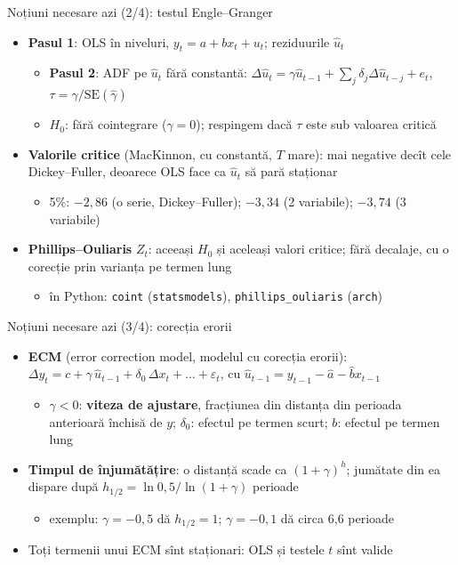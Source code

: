 \begin{frame}{Noțiuni necesare azi (2/4): testul Engle--Granger}
\itemsize{\small}
\begin{itemize}
    \item \textbf{Pasul 1}: OLS în niveluri, $y_t = a + b x_t + u_t$; reziduurile $\hat u_t$
    \begin{itemize}
        \item \textbf{Pasul 2}: ADF pe $\hat u_t$ fără constantă: $\Delta\hat u_t = \gamma\hat u_{t-1} + \sum_j\delta_j\Delta\hat u_{t-j} + e_t$, $\tau = \hat\gamma/\mathrm{SE}(\hat\gamma)$
        \item $H_0$: fără cointegrare ($\gamma = 0$); respingem dacă $\tau$ este sub valoarea critică
    \end{itemize}
    \item \textbf{Valorile critice} (MacKinnon, cu constantă, $T$ mare): mai negative decît cele Dickey--Fuller, deoarece OLS face ca $\hat u_t$ să pară staționar
    \begin{itemize}
        \item 5\%: $-2{,}86$ (o serie, Dickey--Fuller); $-3{,}34$ (2 variabile); $-3{,}74$ (3 variabile)
    \end{itemize}
    \item \textbf{Phillips--Ouliaris} $Z_t$: aceeași $H_0$ și aceleași valori critice; fără decalaje, cu o corecție prin varianța pe termen lung
    \begin{itemize}
        \item în Python: \texttt{coint} (\texttt{statsmodels}), \texttt{phillips\_ouliaris} (\texttt{arch})
    \end{itemize}
\end{itemize}
\end{frame}

\begin{frame}{Noțiuni necesare azi (3/4): corecția erorii}
\itemsize{\small}
\begin{itemize}
    \item \textbf{ECM} (error correction model, modelul cu corecția erorii): $\Delta y_t = c + \gamma\,\hat u_{t-1} + \delta_0\,\Delta x_t + \dots + \varepsilon_t$, cu $\hat u_{t-1} = y_{t-1} - \hat a - \hat b x_{t-1}$
    \begin{itemize}
        \item $\gamma < 0$: \textbf{viteza de ajustare}, fracțiunea din distanța din perioada anterioară închisă de $y$; $\delta_0$: efectul pe termen scurt; $b$: efectul pe termen lung
    \end{itemize}
    \item \textbf{Timpul de înjumătățire}: o distanță scade ca $(1 + \gamma)^h$; jumătate din ea dispare după $h_{1/2} = \ln 0{,}5/\ln(1 + \gamma)$ perioade
    \begin{itemize}
        \item exemplu: $\gamma = -0{,}5$ dă $h_{1/2} = 1$; $\gamma = -0{,}1$ dă circa 6{,}6 perioade
    \end{itemize}
    \item Toți termenii unui ECM sînt staționari: OLS și testele $t$ sînt valide
\end{itemize}
\end{frame}

